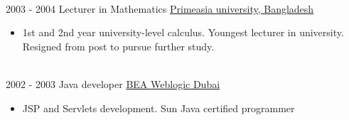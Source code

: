 \documentclass[letterpaper]{twentysecondcv} %
\begin{document}
\begin{twenty}
    	\\ 
      \twentyitem
   		{2003 -}
		{2004}
        {Lecturer in Mathematics}
        {\href{http://www.primeasia.edu.bd/}{Primeasia university, Bangladesh}}
        {
        \begin{itemize}
        \item 1st and 2nd year university-level calculus. Youngest lecturer in university. Resigned from post to pursue further study. 
 
        \end{itemize}
        }{}
	\\ 
      \twentyitem
   		{2002 - }
		{2003}
        {Java developer}
        {\href{https://en.wikipedia.org/wiki/BEA_Systems}{BEA Weblogic Dubai}}
		{
		\begin{itemize}
		\item JSP and Servlets development. Sun Java certified programmer
		\end{itemize}		
		}{}
	\\ 
     
        
        
\end{twenty}

\end{document}
